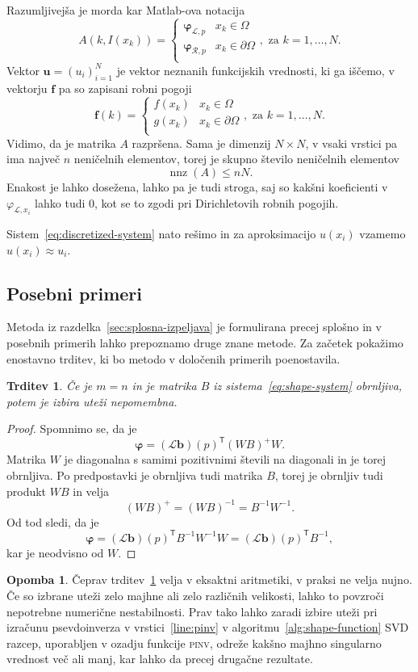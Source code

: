 \documentclass[12pt,a4paper,twoside]{article}
\theoremstyle{definition} %
\newtheorem{opomba}[definicija]{Opomba}
\theoremstyle{plain} %
\newtheorem{trditev}[definicija]{Trditev}
\numberwithin{equation}{section}
\newcommand{\Rc}{\mathcal{R}}
\renewcommand{\L}{\mathcal{L}}
\newcommand{\T}{\mathsf{T}}
\renewcommand{\b}{\boldsymbol}
\renewcommand{\phi}{\varphi}
\DeclareMathOperator{\nnz}{nnz}
\begin{document}
Razumljivejša je morda kar Matlab-ova notacija
\[
A(k, I(x_k)) = \begin{cases}
    \b\phi_{\L, p} & x_k \in \Omega \\
    \b\phi_{\Rc, p} & x_k \in \partial\Omega \\
  \end{cases}, \text{ za $k = 1, \ldots, N$}.
\]
Vektor $\b{u} = (u_i)_{i=1}^N$ je vektor neznanih funkcijskih vrednosti, ki ga
iščemo, v vektorju $\b{f}$ pa so zapisani robni pogoji
\[
  \b f(k) = \begin{cases}
    f(x_k) & x_k \in \Omega \\
    g(x_k) & x_k \in \partial\Omega \\
  \end{cases}, \text{ za $k = 1, \ldots, N$}.
\]
Vidimo, da je matrika $A$ razpršena. Sama je dimenzij $N\times N$,
v vsaki vrstici pa ima največ $n$ neničelnih
elementov, torej je skupno število neničelnih elementov
\[
  \nnz(A) \leq nN.
\]
Enakost je lahko dosežena, lahko pa je tudi stroga, saj so kakšni koeficienti v $\phi_{\L,x_i}$ lahko
tudi 0, kot se to zgodi pri Dirichletovih robnih pogojih.

Sistem~\eqref{eq:discretized-system} nato rešimo in za aproksimacijo $u(x_i)$
vzamemo $u(x_i) \approx u_i$.

\subsection{Posebni primeri}
\label{sec:posebni-primeri}
Metoda iz razdelka~\ref{sec:splosna-izpeljava} je formulirana precej splošno in
v posebnih primerih lahko prepoznamo druge znane metode. Za začetek pokažimo
enostavno trditev, ki bo metodo v določenih primerih poenostavila.
\begin{trditev}
  \label{trd:weight-independence}
  Če je $m = n$ in je matrika $B$ iz sistema~\eqref{eq:shape-system} obrnljiva,
  potem je izbira uteži nepomembna.
\end{trditev}
\begin{proof}
Spomnimo se, da je \[
  \b\phi = (\L\b{b})(p)^\T(WB)^{+}W.
\]
Matrika $W$ je diagonalna s samimi pozitivnimi števili na diagonali in je torej
obrnljiva. Po predpostavki je obrnljiva tudi matrika $B$, torej je obrnljiv tudi
produkt $WB$ in velja
\[
  (WB)^+ = (WB)^{-1} = B^{-1}W^{-1}.
\]
Od tod sledi, da je
\[
  \b\phi = (\L\b{b})(p)^\T B^{-1} W^{-1} W = (\L\b{b})(p)^\T B^{-1},
\]
kar je neodvisno od $W$.
\end{proof}
\begin{opomba}
  Čeprav trditev~\ref{trd:weight-independence} velja v eksaktni aritmetiki, v
  praksi ne velja nujno. Če so izbrane uteži zelo majhne ali zelo različnih
  velikosti, lahko to povzroči nepotrebne numerične nestabilnosti. Prav tako
  lahko zaradi izbire uteži pri izračunu psevdoinverza v vrstici~\ref{line:pinv}
  v algoritmu~\ref{alg:shape-function} SVD razcep, uporabljen v ozadju
  funkcije \textsc{pinv}, odreže kakšno majhno singularno vrednost več ali manj,
  kar lahko da precej drugačne rezultate.
\end{opomba}
\end{document}
